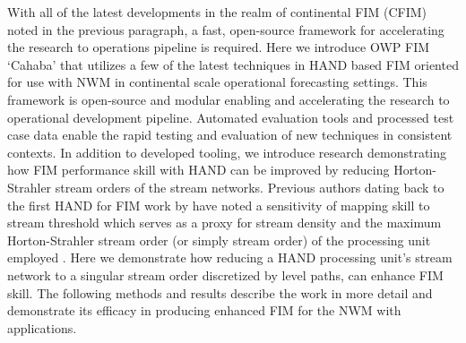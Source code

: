 With all of the latest developments in the realm of continental FIM (CFIM) noted in the previous paragraph, a fast, open-source framework for accelerating the research to operations pipeline is required.
Here we introduce OWP FIM `Cahaba' that utilizes a few of the latest techniques in HAND based FIM oriented for use with NWM in continental scale operational forecasting settings. 
This framework is open-source and modular enabling and accelerating the research to operational development pipeline.
Automated evaluation tools and processed test case data enable the rapid testing and evaluation of new techniques in consistent contexts.
In addition to developed tooling, we introduce research demonstrating how FIM performance skill with HAND can be improved by reducing Horton-Strahler stream orders \cite{horton1945erosional,strahler1952hypsometric,strahler1952hypsometric} of the stream networks.
Previous authors dating back to the first HAND for FIM work by  have noted a sensitivity of mapping skill to stream threshold which serves as a proxy for stream density and the maximum Horton-Strahler stream order (or simply stream order) of the processing unit employed \cite{zhang2018comparative,mcgehee2016modified,li2020evaluation}.
Here we demonstrate how reducing a HAND processing unit's stream network to a singular stream order discretized by level paths, can enhance FIM skill.
The following methods and results describe the work in more detail and demonstrate its efficacy in producing enhanced FIM for the NWM with applications.
%
